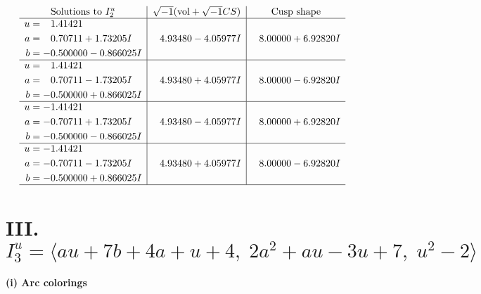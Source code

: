 \documentclass[1p]{elsarticle_modified}
\theoremstyle{definition}
\newcommand{\I}{\sqrt{-1}}
\begin{document}
$$\begin{array}{c|c|c}  
\text{Solutions to }I^u_{2}& \I (\text{vol} + \sqrt{-1}CS) & \text{Cusp shape}\\
 \hline 
\begin{aligned}
u &= \phantom{-}1.41421\phantom{ +0.000000I} \\
a &= \phantom{-}0.70711 + 1.73205 I \\
b &= -0.500000 - 0.866025 I\end{aligned}
 & \phantom{-}4.93480 - 4.05977 I & \phantom{-}8.00000 + 6.92820 I \\ \hline\begin{aligned}
u &= \phantom{-}1.41421\phantom{ +0.000000I} \\
a &= \phantom{-}0.70711 - 1.73205 I \\
b &= -0.500000 + 0.866025 I\end{aligned}
 & \phantom{-}4.93480 + 4.05977 I & \phantom{-}8.00000 - 6.92820 I \\ \hline\begin{aligned}
u &= -1.41421\phantom{ +0.000000I} \\
a &= -0.70711 + 1.73205 I \\
b &= -0.500000 - 0.866025 I\end{aligned}
 & \phantom{-}4.93480 - 4.05977 I & \phantom{-}8.00000 + 6.92820 I \\ \hline\begin{aligned}
u &= -1.41421\phantom{ +0.000000I} \\
a &= -0.70711 - 1.73205 I \\
b &= -0.500000 + 0.866025 I\end{aligned}
 & \phantom{-}4.93480 + 4.05977 I & \phantom{-}8.00000 - 6.92820 I\\
 \hline 
 \end{array}$$\newpage\newpage\renewcommand{\arraystretch}{1}
\centering \section*{III. $I^u_{3}= \langle a u+7 b+4 a+u+4,\;2 a^2+a u-3 u+7,\;u^2-2 \rangle$}
\flushleft \textbf{(i) Arc colorings}\\
\end{document}
